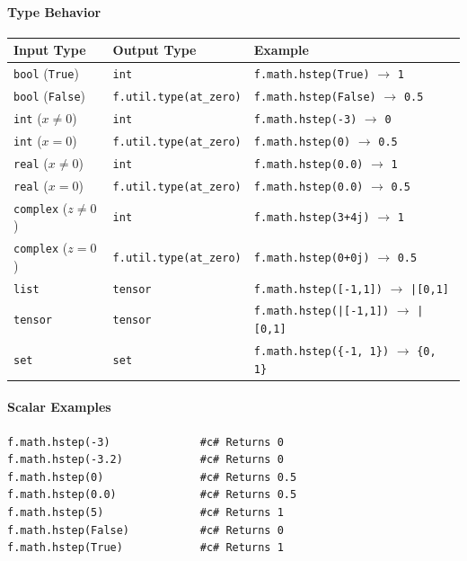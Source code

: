 \paragraph{Type Behavior}
\begin{center}
\begin{tabular}{lll}
\textbf{Input Type} & \textbf{Output Type} & \textbf{Example} \\ \hline
\texttt{bool} (\texttt{True}) & \texttt{int} & \texttt{f.math.hstep(True)} $\to$ \texttt{1} \\
\texttt{bool} (\texttt{False}) & \texttt{f.util.type(at\_zero)} & \texttt{f.math.hstep(False)} $\to$ \texttt{0.5} \\
\texttt{int} ($x \neq 0$) & \texttt{int} & \texttt{f.math.hstep(-3)} $\to$ \texttt{0} \\
\texttt{int} ($x = 0$) & \texttt{f.util.type(at\_zero)} & \texttt{f.math.hstep(0)} $\to$ \texttt{0.5} \\
\texttt{real} ($x \neq 0$) & \texttt{int} & \texttt{f.math.hstep(0.0)} $\to$ \texttt{1} \\
\texttt{real} ($x = 0$) & \texttt{f.util.type(at\_zero)} & \texttt{f.math.hstep(0.0)} $\to$ \texttt{0.5} \\
\texttt{complex} ($z \neq 0$) & \texttt{int} & \texttt{f.math.hstep(3+4j)} $\to$ \texttt{1} \\
\texttt{complex} ($z = 0$) & \texttt{f.util.type(at\_zero)} & \texttt{f.math.hstep(0+0j)} $\to$ \texttt{0.5} \\
\texttt{list} & \texttt{tensor} & \texttt{f.math.hstep([-1,1])} $\to$ \texttt{|[0,1]} \\
\texttt{tensor} & \texttt{tensor} & \texttt{f.math.hstep(|[-1,1])} $\to$ \texttt{|[0,1]} \\
\texttt{set} & \texttt{set} & \texttt{f.math.hstep(\{-1, 1\})} $\to$ \texttt{\{0, 1\}} \\
\end{tabular}
\end{center}

\paragraph{Scalar Examples}
\begin{verbatim}
f.math.hstep(-3)              #c# Returns 0
f.math.hstep(-3.2)            #c# Returns 0
f.math.hstep(0)               #c# Returns 0.5
f.math.hstep(0.0)             #c# Returns 0.5
f.math.hstep(5)               #c# Returns 1
f.math.hstep(False)           #c# Returns 0
f.math.hstep(True)            #c# Returns 1
\end{verbatim}

